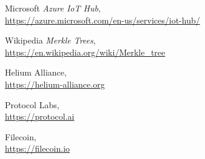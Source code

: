 \documentclass[letterpaper,11pt]{article}
\begin{document}
\begin{thebibliography}{9}
	Microsoft
		\textit{Azure IoT Hub}, \\
		\url{https://azure.microsoft.com/en-us/services/iot-hub/}

	Wikipedia
		\textit{Merkle Trees}, \\
		\url{https://en.wikipedia.org/wiki/Merkle_tree}

	Helium Alliance, \\
		\url{https://helium-alliance.org}

	Protocol Labs, \\
		\url{https://protocol.ai}

	Filecoin, \\
		\url{https://filecoin.io}

\end{thebibliography}
\end{document}
